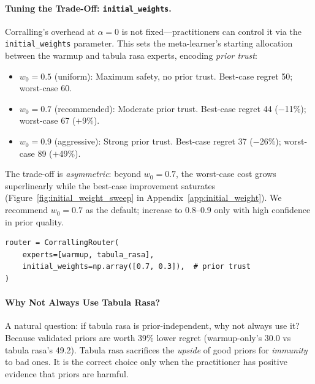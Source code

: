 \paragraph{Tuning the Trade-Off: \texttt{initial\_weights}.}
Corralling's overhead at $\alpha{=}0$ is not fixed---practitioners
can control it via the \texttt{initial\_weights} parameter.
This sets the meta-learner's starting allocation between the warmup
and tabula rasa experts, encoding \emph{prior trust}:

\begin{itemize}[nosep]
    \item $w_0{=}0.5$ (uniform): Maximum safety, no prior trust.
          Best-case regret 50; worst-case 60.
    \item $w_0{=}0.7$ (recommended): Moderate prior trust.
          Best-case regret 44 ($-$11\%); worst-case 67 ($+$9\%).
    \item $w_0{=}0.9$ (aggressive): Strong prior trust.
          Best-case regret 37 ($-$26\%); worst-case 89 ($+$49\%).
\end{itemize}

\noindent
The trade-off is \emph{asymmetric}: beyond $w_0{=}0.7$, the
worst-case cost grows superlinearly while the best-case improvement
saturates (Figure~\ref{fig:initial_weight_sweep} in
Appendix~\ref{app:initial_weight}).
We recommend $w_0{=}0.7$ as the default; increase to 0.8--0.9 only
with high confidence in prior quality.

\begin{verbatim}
router = CorrallingRouter(
    experts=[warmup, tabula_rasa],
    initial_weights=np.array([0.7, 0.3]),  # prior trust
)
\end{verbatim}

\paragraph{Why Not Always Use Tabula Rasa?}
A natural question: if tabula rasa is prior-independent, why not always
use it?  Because validated priors are worth 39\% lower regret
(warmup-only's 30.0 vs tabula rasa's 49.2).
Tabula rasa sacrifices the \emph{upside} of good priors for
\emph{immunity} to bad ones.  It is the correct choice only when the
practitioner has positive evidence that priors are harmful.

